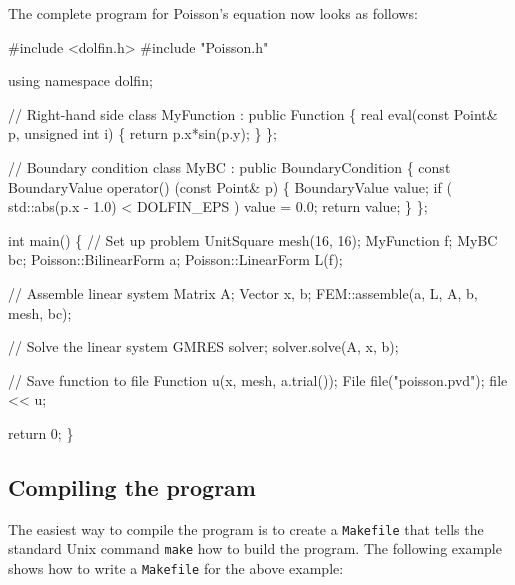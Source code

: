 The complete program for Poisson's equation now looks as follows:
\footnotesize
\begin{code}
  #include <dolfin.h>
  #include "Poisson.h"
  
  using namespace dolfin;
  
  // Right-hand side
  class MyFunction : public Function
  \{
    real eval(const Point& p, unsigned int i)
    \{
      return p.x*sin(p.y);
    \}
  \};

  // Boundary condition
  class MyBC : public BoundaryCondition
  \{
    const BoundaryValue operator() (const Point& p)
    \{
      BoundaryValue value;
      if ( std::abs(p.x - 1.0) < DOLFIN_EPS )
      value = 0.0;
      return value;
    \}
  \};
  
  int main()
  \{
    // Set up problem
    UnitSquare mesh(16, 16);
    MyFunction f;
    MyBC bc;
    Poisson::BilinearForm a;
    Poisson::LinearForm L(f);
    
    // Assemble linear system
    Matrix A;
    Vector x, b;
    FEM::assemble(a, L, A, b, mesh, bc);
    
    // Solve the linear system
    GMRES solver;
    solver.solve(A, x, b);
    
    // Save function to file
    Function u(x, mesh, a.trial());
    File file("poisson.pvd");
    file << u;
    
    return 0;
  \}
\end{code}
\normalsize

\subsection{Compiling the program}

The easiest way to compile the program is to create a
\texttt{Makefile} that tells the standard Unix command \texttt{make}
how to build the program. The following example shows how to write a
\texttt{Makefile} for the above example:
\footnotesize
{}
\normalsize

